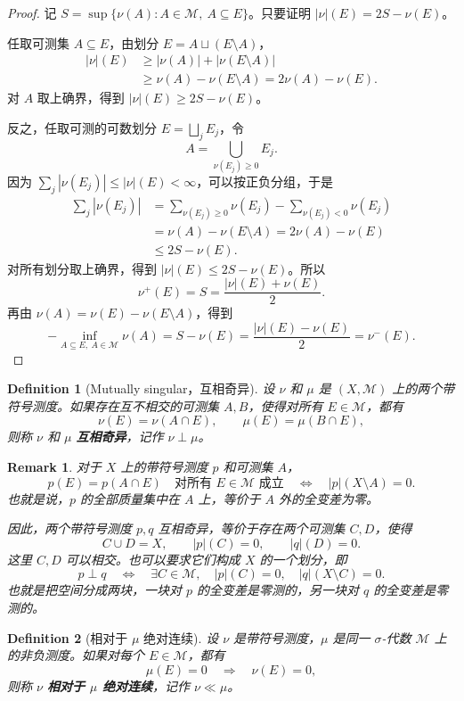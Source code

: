 \documentclass[12pt,letterpaper,twoside,openright]{ctexbook}
\theoremstyle{bluehead}
\theoremstyle{olivehead}
\newtheorem{definition}{Definition}
\theoremstyle{orangehead}
\theoremstyle{redremark}
\newtheorem*{remark}{Remark}
\begin{document}
\begin{proof}
记 $S=\sup\{\nu(A):A\in\mathcal M,\ A\subseteq E\}$。只要证明 $|\nu|(E)=2S-\nu(E)$。

任取可测集 $A\subseteq E$，由划分 $E=A\sqcup(E\setminus A)$，
\[
\begin{aligned}
|\nu|(E)&\geq|\nu(A)|+|\nu(E\setminus A)|\\
&\geq\nu(A)-\nu(E\setminus A)
=2\nu(A)-\nu(E).
\end{aligned}
\]
对 $A$ 取上确界，得到 $|\nu|(E)\geq2S-\nu(E)$。

反之，任取可测的可数划分 $E=\bigsqcup_jE_j$，令
\[
A=\bigcup_{\nu(E_j)\geq0}E_j.
\]
因为 $\sum_j|\nu(E_j)|\leq|\nu|(E)<\infty$，可以按正负分组，于是
\[
\begin{aligned}
\sum_j|\nu(E_j)|
&=\sum_{\nu(E_j)\geq0}\nu(E_j)-\sum_{\nu(E_j)<0}\nu(E_j)\\
&=\nu(A)-\nu(E\setminus A)
=2\nu(A)-\nu(E)\\
&\leq2S-\nu(E).
\end{aligned}
\]
对所有划分取上确界，得到 $|\nu|(E)\leq2S-\nu(E)$。所以
\[
\nu^+(E)=S=\frac{|\nu|(E)+\nu(E)}2.
\]
再由 $\nu(A)=\nu(E)-\nu(E\setminus A)$，得到
\[
-\inf_{A\subseteq E,\ A\in\mathcal M}\nu(A)
=S-\nu(E)=\frac{|\nu|(E)-\nu(E)}2=\nu^-(E).
\]
\end{proof}
\begin{definition}[Mutually singular，互相奇异]
设 $\nu$ 和 $\mu$ 是 $(X,\mathcal M)$ 上的两个带符号测度。如果存在互不相交的可测集 $A,B$，使得对所有 $E\in\mathcal M$，都有
\[
\nu(E)=\nu(A\cap E),\qquad
\mu(E)=\mu(B\cap E),
\]
则称 $\nu$ 和 $\mu$ \textbf{互相奇异}，记作 $\nu\perp\mu$。
\end{definition}
\begin{remark}
对于 $X$ 上的带符号测度 $p$ 和可测集 $A$，
\[
p(E)=p(A\cap E)\quad\text{对所有 }E\in\mathcal M\text{ 成立}
\quad\Longleftrightarrow\quad
|p|(X\setminus A)=0.
\]
也就是说，$p$ 的全部质量集中在 $A$ 上，等价于 $A$ 外的全变差为零。

因此，两个带符号测度 $p,q$ 互相奇异，等价于存在两个可测集 $C,D$，使得
\[
C\cup D=X,\qquad |p|(C)=0,\qquad |q|(D)=0.
\]
这里 $C,D$ 可以相交。也可以要求它们构成 $X$ 的一个划分，即
\[
p\perp q
\quad\Longleftrightarrow\quad
\exists C\in\mathcal M,\quad |p|(C)=0,\quad |q|(X\setminus C)=0.
\]
也就是把空间分成两块，一块对 $p$ 的全变差是零测的，另一块对 $q$ 的全变差是零测的。
\end{remark}
\begin{definition}[相对于 $\mu$ 绝对连续]
设 $\nu$ 是带符号测度，$\mu$ 是同一 $\sigma$-代数 $\mathcal M$ 上的非负测度。如果对每个 $E\in\mathcal M$，都有
\[
\mu(E)=0\quad\Longrightarrow\quad\nu(E)=0,
\]
则称 $\nu$ \textbf{相对于 $\mu$ 绝对连续}，记作 $\nu\ll\mu$。
\end{definition}
\end{document}
